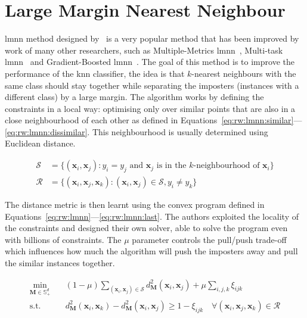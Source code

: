 \documentclass[12pt,a4paper]{report}
\begin{document}
\section{Large Margin Nearest Neighbour} \label{chap:rw:lmnn}

\Acf{lmnn} method designed by~\citep{weinberger2009distance} is a very popular method that has been improved by work of many other researchers, such as Multiple-Metrics \ac{lmnn}~\citep{weinberger2008fast}, Multi-task \ac{lmnn}~\citep{parameswaran2010large} and Gradient-Boosted \ac{lmnn}~\citep{kedem2012non}. The goal of this method is to improve the performance of the \ac{knn} classifier, the idea is that $k$-nearest neighbours with the same class should stay together while separating the imposters (instances with a different class) by a large margin. The algorithm works by defining the constraints in a local way: optimising only over similar points that are also in a close neighbourhood of each other as defined in Equations~\ref{eq:rw:lmnn:similar}---\ref{eq:rw:lmnn:dissimilar}. This neighbourhood is usually determined using Euclidean distance.

\begin{align}
\mathcal{S} &= \lbrace(\bm{x}_i,\bm{x}_j): y_i = y_j \text{ and } \bm{x}_j \text{ is in the }k\text{-neighbourhood of } \bm{x}_i \rbrace \label{eq:rw:lmnn:similar} \\
\mathcal{R} &= \lbrace(\bm{x}_i,\bm{x}_j,\bm{x}_k): (\bm{x}_i,\bm{x}_j) \in \mathcal{S}, y_i \neq y_k \rbrace \label{eq:rw:lmnn:dissimilar}
\end{align}

The distance metric is then learnt using the convex program defined in Equations~\ref{eq:rw:lmnn}---\ref{eq:rw:lmnn:last}. The authors exploited the locality of the constraints and designed their own solver, able to solve the program even with billions of constraints. The $\mu$ parameter controls the pull/push trade-off which influences how much the algorithm will push the imposters away and pull the similar instances together.

\begin{align}
\min_{\bm{M} \in \mathbb{S}^{d}_+} \quad & (1-\mu)\sum_{(\bm{x}_i,\bm{x}_j)\in \mathcal{S}} d_{\bm{M}}^2(\bm{x}_i,\bm{x}_j) + \mu \sum_{i,j,k} \xi_{ijk} \label{eq:rw:lmnn} \\
\text{s.t.} \quad & d_{\bm{M}}^2(\bm{x}_i,\bm{x}_k) - d_{\bm{M}}^2(\bm{x}_i,\bm{x}_j) \geq 1 - \xi_{ijk} \quad \forall(\bm{x}_i,\bm{x}_j,\bm{x}_k) \in \mathcal{R} \label{eq:rw:lmnn:last}
\end{align}
\end{document}
